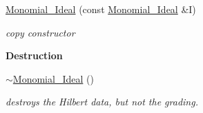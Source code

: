\begin{Indent}
\begin{DoxyCompactItemize}
\mbox{\label{group__polygroup_aa20312c8d7f14a18d73128a99d1d5c04}} 
\hyperlink{group__polygroup_aa20312c8d7f14a18d73128a99d1d5c04}{Monomial\+\_\+\+Ideal} (const \hyperlink{group__polygroup_class_monomial___ideal}{Monomial\+\_\+\+Ideal} \&I)
\begin{DoxyCompactList}\small\item\em copy constructor \end{DoxyCompactList}\end{DoxyCompactItemize}
\end{Indent}
\begin{Indent}\textbf{ Destruction}\par
\begin{DoxyCompactItemize}
\item 
\mbox{\label{group__polygroup_a96f5e7396229382fbcbe8f7c4ceeaa65}} 
\hyperlink{group__polygroup_a96f5e7396229382fbcbe8f7c4ceeaa65}{$\sim$\+Monomial\+\_\+\+Ideal} ()
\begin{DoxyCompactList}\small\item\em destroys the Hilbert data, but not the grading. \end{DoxyCompactList}\end{DoxyCompactItemize}
\end{Indent}
